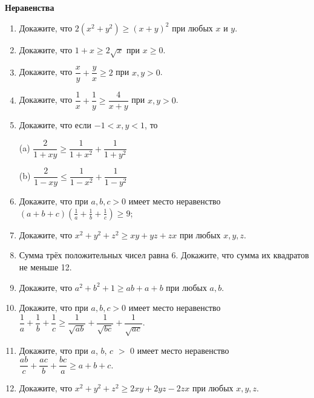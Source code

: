 \documentclass{article}
\begin{document}
    \large


    \begin{center}
        \textbf{Неравенства}
    \end{center}

    \begin{enumerate}[label*=\protect\fbox{\arabic{enumi}}]

        \item Докажите, что  $2(x^2 + y^2) \geqslant (x + y)^2$  при любых $x$ и $y$.

        \item Докажите, что $1+x\geqslant 2\sqrt{x}$ при $x \ge 0$.

        \item Докажите, что  $\dfrac{x}{y} + \dfrac{y}{x} \geqslant 2$  при  $x, y > 0$.

        \item Докажите, что $\dfrac{1}{x}+\dfrac{1}{y}\geqslant\dfrac{4}{x+y}$ при $x, y > 0$.

        \item Докажите, что если $-1 < x, y < 1$, то

        (a) $\dfrac{2}{1+x y} \geqslant \dfrac{1}{1+x^{2}}+\dfrac{1}{1+y^{2}}$

        (b) $\dfrac{2}{1-x y} \leqslant \dfrac{1}{1-x^{2}}+\dfrac{1}{1-y^{2}}$

        \item  Докажите, что при $a, b, c > 0$ имеет место неравенство $\displaystyle (a+b+c)\left(\frac{1}{a} + \frac{1}{b} + \frac{1}{c}\right) \geq 9$;

        \item Докажите, что  $x^2 + y^2 + z^2 \ge xy + yz + zx$ при любых $x, y, z$.

        \item Сумма трёх положительных чисел равна 6.
        Докажите, что сумма их квадратов не меньше 12.

        \item Докажите, что $a^2 + b^2 + 1 \ge ab + a + b$ при любых $a, b$.

        \item Докажите, что при $a, b, c > 0$ имеет место неравенство $\dfrac{1}{a}+\dfrac{1}{b}+\dfrac{1}{c}\ge\dfrac{1}{\sqrt{ab}}+\dfrac{1}{\sqrt{bc}}+\dfrac{1}{\sqrt{ac}}.$

        \item Докажите, что при  $a$, $b$, $c$ $>$ $0$  имеет место неравенство $\dfrac{ab}{c}+\dfrac{ac}{b}+\dfrac{bc}{a}\ge a+b+c.$
        \item Докажите, что  $x^2 + y^2 + z^2 \ge 2xy + 2yz - 2zx$  при любых $x, y, z$.


\end{enumerate}
\end{document}
